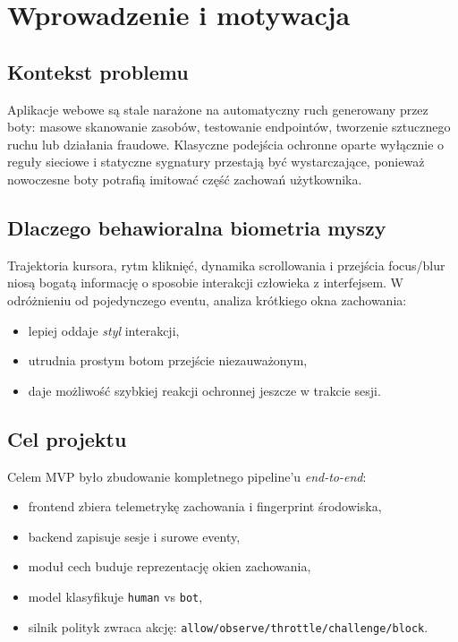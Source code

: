 \section{Wprowadzenie i motywacja}

\subsection{Kontekst problemu}
Aplikacje webowe są stale narażone na automatyczny ruch generowany przez boty:
masowe skanowanie zasobów, testowanie endpointów, tworzenie sztucznego ruchu
lub działania fraudowe. Klasyczne podejścia ochronne oparte wyłącznie o reguły
sieciowe i statyczne sygnatury przestają być wystarczające, ponieważ nowoczesne
boty potrafią imitować część zachowań użytkownika.

\subsection{Dlaczego behawioralna biometria myszy}
Trajektoria kursora, rytm kliknięć, dynamika scrollowania i przejścia focus/blur
niosą bogatą informację o sposobie interakcji człowieka z interfejsem.
W odróżnieniu od pojedynczego eventu, analiza krótkiego okna zachowania:

\begin{itemize}
  \item lepiej oddaje \textit{styl} interakcji,
  \item utrudnia prostym botom przejście niezauważonym,
  \item daje możliwość szybkiej reakcji ochronnej jeszcze w trakcie sesji.
\end{itemize}

\subsection{Cel projektu}
Celem MVP było zbudowanie kompletnego pipeline'u \textit{end-to-end}:
\begin{itemize}
  \item frontend zbiera telemetrykę zachowania i fingerprint środowiska,
  \item backend zapisuje sesje i surowe eventy,
  \item moduł cech buduje reprezentację okien zachowania,
  \item model klasyfikuje \texttt{human} vs \texttt{bot},
  \item silnik polityk zwraca akcję: \texttt{allow/observe/throttle/challenge/block}.
\end{itemize}

